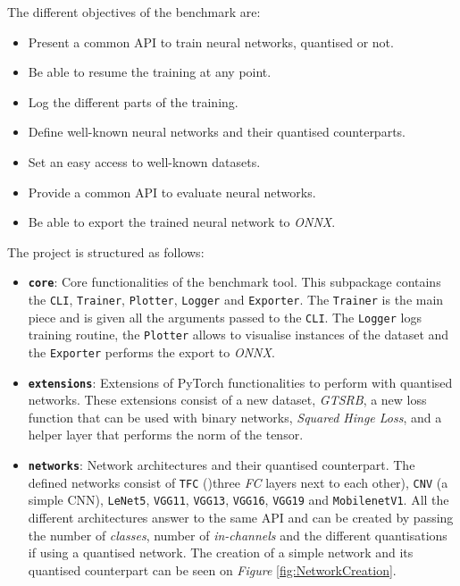 The different objectives of the benchmark are:
\begin{itemize}
  \item Present a common API to train neural networks, quantised or not.
  \item Be able to resume the training at any point.
  \item Log the different parts of the training.
  \item Define well-known neural networks and their quantised counterparts.
  \item Set an easy access to well-known datasets.
  \item Provide a common API to evaluate neural networks.
  \item Be able to export the trained neural network to \emph{ONNX}.
\end{itemize}

The project is structured as follows:
\begin{itemize}
  \item \textbf{\texttt{core}}: Core functionalities of the benchmark tool. This subpackage contains the \texttt{CLI}, \texttt{Trainer}, \texttt{Plotter}, \texttt{Logger} and \texttt{Exporter}. The \texttt{Trainer} is the main piece and is given all the arguments passed to the \texttt{CLI}. The \texttt{Logger} logs training routine, the \texttt{Plotter} allows to visualise instances of the dataset and the \texttt{Exporter} performs the export to \emph{ONNX}.
  \item \textbf{\texttt{extensions}}: Extensions of PyTorch functionalities to perform with quantised networks. These extensions consist of a new dataset, \emph{GTSRB}, a new loss function that can be used with binary networks, \emph{Squared Hinge Loss}, and a helper layer that performs the norm of the tensor.
  \item \textbf{\texttt{networks}}: Network architectures and their quantised counterpart. The defined networks consist of \texttt{TFC} ()three \emph{FC} layers next to each other), \texttt{CNV} (a simple CNN), \texttt{LeNet5}, \texttt{VGG11}, \texttt{VGG13}, \texttt{VGG16}, \texttt{VGG19} and \texttt{MobilenetV1}. All the different architectures answer to the same API and can be created by passing the number of \emph{classes}, number of \emph{in-channels} and the different quantisations if using a quantised network. The creation of a simple network and its quantised counterpart can be seen on \emph{Figure} \ref{fig:NetworkCreation}.
\end{itemize}

